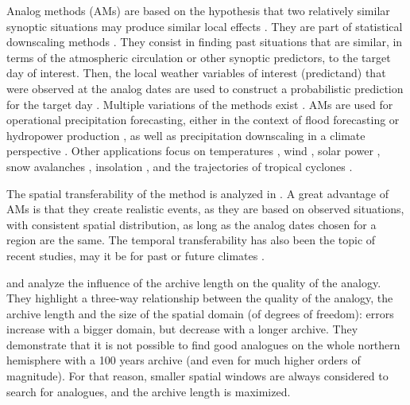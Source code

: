 \documentclass[hess, manuscript]{copernicus}
\begin{document}
\introduction  %
\label{sec:introduction}

Analog methods (AMs) are based on the hypothesis that two relatively similar synoptic situations may produce similar local effects \citep{Lorenz1956, Lorenz1969}. They are part of statistical downscaling methods \cite{Maraun2010}. They consist in finding past situations that are similar, in terms of the atmospheric circulation or other synoptic predictors, to the target day of interest. Then, the local weather variables of interest (predictand) that were observed at the analog dates are used to construct a probabilistic prediction for the target day \citep{Duband1970, Zorita1999}. Multiple variations of the methods exist \citep[a non exhaustive listing can be found in][]{BenDaoud2016}. AMs are used for operational precipitation forecasting, either in the context of flood forecasting or hydropower production \citep[e.g.,][]{Guilbaud1997, Bontron2005, Hamill2006, Desaint2008a, GarciaHernandez2009b, Bliefernicht2010, Marty2010, Marty2012, Horton2012, Obled2014, Hamill2015, BenDaoud2016}, as well as precipitation downscaling in a climate perspective \citep[e.g.,][]{Radanovics2013, Chardon2014, Dayon2015}. Other applications focus on temperatures \citep{Radinovic1975, Woodcock1980, Kruizinga1983, DelleMonache2013, Caillouet2016}, wind \citep{Gordon1987, DelleMonache2013, DelleMonache2011, Vanvyve2015, Alessandrini2015, Junk2015, Junk2015c}, solar power \citep{Alessandrini2015a, Bessa2015}, snow avalanches \citep{Obled1980, Bolognesi1993}, insolation \citep{Bois1981}, and the trajectories of tropical cyclones \citep{Keenan1981, Sievers2000, Fraedrich2003}.

The spatial transferability of the method is analyzed in \citet{Chardon2014}. A great advantage of AMs is that they create realistic events, as they are based on observed situations, with consistent spatial distribution, as long as the analog dates chosen for a region are the same. The temporal transferability has also been the topic of recent studies, may it be for past or future climates \citep{Dayon2015, Caillouet2016}.

\citet{Ruosteenoja1988} and \citet{Vandendool1994} analyze the influence of the archive length on the quality of the analogy. They highlight a three-way relationship between the quality of the analogy, the archive length and the size of the spatial domain (of degrees of freedom): errors increase with a bigger domain, but decrease with a longer archive. They demonstrate that it is not possible to find good analogues on the whole northern hemisphere with a 100 years archive (and even for much higher orders of magnitude). For that reason, smaller spatial windows are always considered to search for analogues, and the archive length is maximized. 
\end{document}
